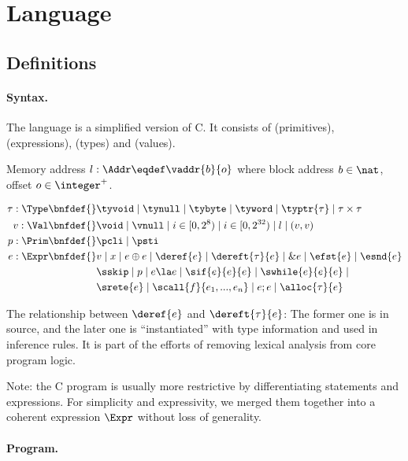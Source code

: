\section{Language}
\label{sec:language}

\subsection{Definitions}

\paragraph{Syntax.}\label{p:type}

The language is a simplified version of C. It consists of \Prim{} (primitives), \Expr{} (expressions), \Type{} (types) and \Val{} (values).

Memory address $l: \Addr \eqdef \vaddr{b}{o}$ where block address $b \in \nat$, offset $o \in \integer^{+}$.

\begin{align*}
    \tau : \Type \bnfdef{}&
        \tyvoid \mid \tynull \mid \tybyte \mid \tyword \mid \typtr{\tau} \mid \tau \times \tau
\\
    v : \Val \bnfdef{}&
        \void \mid \vnull \mid i \in [0, 2^8) \mid i \in [0, 2^{32}) \mid l \mid (v, v)
\\
    p : \Prim \bnfdef{}&
        \pcli \mid \psti
\\
    e : \Expr \bnfdef{}&
       v \mid x \mid e \oplus e \mid \deref{e} \mid \dereft{\tau}{e} \mid \& e \mid \efst{e} \mid \esnd{e} \\&
       \sskip \mid p \mid e \la e \mid \sif{e}{e}{e} \mid \swhile{e}{e}{e} \mid \\&
       \srete{e} \mid \scall{f}{e_1, ..., e_n} \mid e ; e \mid \alloc{\tau}{e}
\\
\end{align*}

The relationship between $\deref{e}$ and $\dereft{\tau}{e}$: The former one is in source,
and the later one is ``instantiated'' with type information and used in inference rules.
It is part of the efforts of removing lexical analysis from core program logic.

Note: the C program is usually more restrictive by differentiating statements and expressions. For simplicity and
expressivity, we merged them together into a coherent expression $\Expr$ without loss of generality.

\paragraph{Program.}


